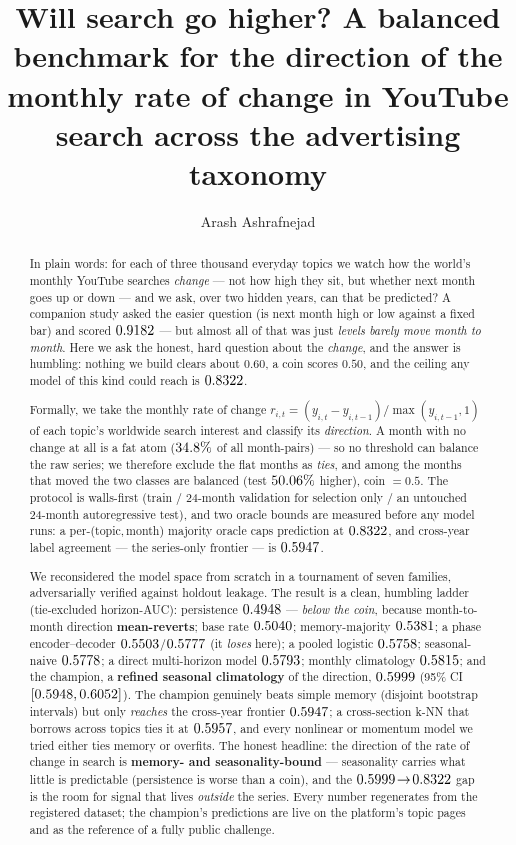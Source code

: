 \documentclass[11pt]{artaquest}
\title{Will search go higher? A balanced benchmark for the direction of the monthly rate of change in YouTube search across the advertising taxonomy}
\author{Arash Ashrafnejad\affmark{1}}
\affiliation{\affmark{1}ArtaQuest Foundation}
\begin{document}
\maketitle

\begin{abstract}
In plain words: for each of three thousand everyday topics we watch how the world's monthly YouTube
searches \emph{change} --- not how high they sit, but whether next month goes up or down --- and we
ask, over two hidden years, can that be predicted? A companion study asked the easier question (is
next month high or low against a fixed bar) and scored $0.9182$ --- but almost all of that was
just \emph{levels barely move month to month}. Here we ask the honest, hard question about the
\emph{change}, and the answer is humbling: nothing we build clears about $0.60$, a coin scores
$0.50$, and the ceiling any model of this kind could reach is $0.8322$.

Formally, we take the monthly rate of change $r_{i,t}=(y_{i,t}-y_{i,t-1})/\max(y_{i,t-1},1)$ of each
topic's worldwide search interest and classify its \emph{direction}. A month with no change at all
is a fat atom ($34.8\%$ of all month-pairs) --- so no threshold can balance the raw series; we
therefore exclude the flat months as \emph{ties}, and among the months that moved the two classes are
balanced (test $50.06\%$ higher), coin $=0.5$. The protocol is walls-first (train / 24-month
validation for selection only / an untouched 24-month autoregressive test), and two oracle bounds are
measured before any model runs: a per-(topic,\,month) majority oracle caps prediction at $0.8322$,
and cross-year label agreement --- the series-only frontier --- is $0.5947$.

We reconsidered the model space from scratch in a tournament of seven families, adversarially verified
against holdout leakage. The result is a clean, humbling ladder (tie-excluded horizon-AUC):
persistence $0.4948$ --- \emph{below the coin}, because month-to-month direction \textbf{mean-reverts};
base rate $0.5040$; memory-majority $0.5381$; a phase encoder--decoder $0.5503$/$0.5777$
(it \emph{loses} here); a pooled logistic $0.5758$; seasonal-naive $0.5778$; a direct
multi-horizon model $0.5793$; monthly climatology $0.5815$; and the champion, a \textbf{refined
seasonal climatology} of the direction, $0.5999$ (95\% CI $[0.5948,0.6052]$). The champion
genuinely beats simple memory (disjoint bootstrap intervals) but only \emph{reaches} the cross-year
frontier $0.5947$; a cross-section k-NN that borrows across topics ties it at $0.5957$, and every
nonlinear or momentum model we tried either ties memory or overfits. The honest headline: the
direction of the rate of change in search is \textbf{memory- and seasonality-bound} --- seasonality
carries what little is predictable (persistence is worse than a coin), and the $0.5999\!\to\!0.8322$
gap is the room for signal that lives \emph{outside} the series. Every number regenerates from the
registered dataset; the champion's predictions are live on the platform's topic pages and as the
reference of a fully public challenge.
\end{abstract}
\end{document}
